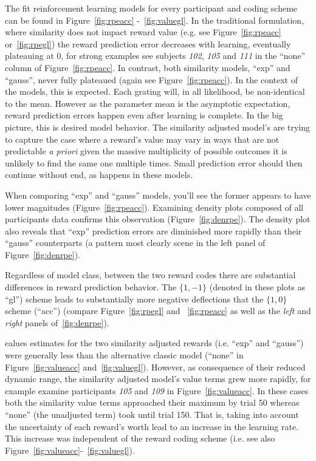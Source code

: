\documentclass[doc,12pt]{apa}        %
\begin{document}
The fit reinforcement learning models for every participant and coding scheme can be found in Figure~\ref{fig:rpeacc} -~\ref{fig:valuegl}.  In the traditional formulation, where similarity does not impact reward value (e.g. see Figure~\ref{fig:rpeacc} or~\ref{fig:rpegl}) the reward prediction error decreases with learning, eventually plateauing at 0, for strong examples see subjects \emph{102}, \emph{105} and \emph{111} in the ``none'' column of Figure~\ref{fig:rpeacc}.  In contrast, both similarity models, ``exp'' and ``gauss'', never fully plateaued (again see Figure~\ref{fig:rpeacc}).  In the context of the models, this is expected.  Each grating will, in all likelihood, be non-identical to the mean. However as the parameter mean is the asymptotic expectation, reward prediction errors happen even after learning is complete.  In the big picture, this is desired model behavior.  The similarity adjusted model's are trying to capture the case where a reward's value may vary in ways that are not predictable \emph{a priori} given the massive multiplicity of possible outcomes it is unlikely to find the same one multiple times.  Small prediction error should then continue without end, as happens in these models.

When comparing ``exp'' and ``gauss'' models, you'll see the former appears to have lower magnitudes (Figure~\ref{fig:rpeacc}).  Examining density plots composed of all participants data confirms this observation (Figure~\ref{fig:denrpe}).  The density plot also reveals that ``exp'' prediction errors are diminished more rapidly than their ``gauss'' counterparts (a pattern most clearly scene in the left panel of Figure~\ref{fig:denrpe}).  

Regardless of model class, between the two reward codes there are substantial differences in reward prediction behavior.  The $\{1,-1\}$ (denoted in these plots as ``gl'') scheme leads to substantially more negative deflections that the $\{1,0\}$ scheme (``acc'') (compare Figure~\ref{fig:rpegl} and ~\ref{fig:rpeacc} as well as the \emph{left} and \emph{right} panels of~\ref{fig:denrpe}).   

ealues estimates for the two similarity adjusted rewards (i.e. ``exp'' and ``gauss'') were generally less than the alternative classic model (``none'' in Figure~\ref{fig:valueacc} and~\ref{fig:valuegl}).  However, as consequence of their reduced dynamic range, the similarity adjusted model's value terms grew more rapidly, for example examine participants \emph{105} and \emph{109} in Figure~\ref{fig:valueacc}.  In these cases both the similarity value terms approached their maximum by trial 50 whereas ``none'' (the unadjusted term) took until trial 150.  That is, taking into account the uncertainty of each reward's worth lead to an increase in the learning rate.  This increase was independent of the reward coding scheme (i.e. see also Figure~\ref{fig:valueacc}-~\ref{fig:valuegl}).  
\end{document}
